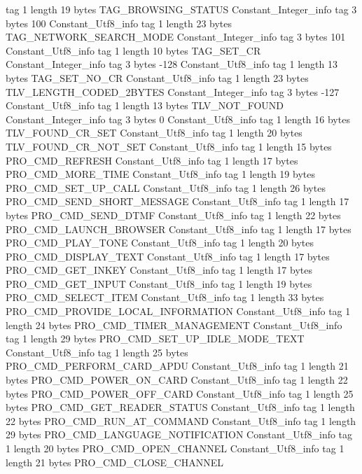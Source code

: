 {{{			tag	1
			length	19
			bytes	TAG_BROWSING_STATUS
		}
		Constant_Integer_info {
			tag	3
			bytes	100
		}
		Constant_Utf8_info {
			tag	1
			length	23
			bytes	TAG_NETWORK_SEARCH_MODE
		}
		Constant_Integer_info {
			tag	3
			bytes	101
		}
		Constant_Utf8_info {
			tag	1
			length	10
			bytes	TAG_SET_CR
		}
		Constant_Integer_info {
			tag	3
			bytes	-128
		}
		Constant_Utf8_info {
			tag	1
			length	13
			bytes	TAG_SET_NO_CR
		}
		Constant_Utf8_info {
			tag	1
			length	23
			bytes	TLV_LENGTH_CODED_2BYTES
		}
		Constant_Integer_info {
			tag	3
			bytes	-127
		}
		Constant_Utf8_info {
			tag	1
			length	13
			bytes	TLV_NOT_FOUND
		}
		Constant_Integer_info {
			tag	3
			bytes	0
		}
		Constant_Utf8_info {
			tag	1
			length	16
			bytes	TLV_FOUND_CR_SET
		}
		Constant_Utf8_info {
			tag	1
			length	20
			bytes	TLV_FOUND_CR_NOT_SET
		}
		Constant_Utf8_info {
			tag	1
			length	15
			bytes	PRO_CMD_REFRESH
		}
		Constant_Utf8_info {
			tag	1
			length	17
			bytes	PRO_CMD_MORE_TIME
		}
		Constant_Utf8_info {
			tag	1
			length	19
			bytes	PRO_CMD_SET_UP_CALL
		}
		Constant_Utf8_info {
			tag	1
			length	26
			bytes	PRO_CMD_SEND_SHORT_MESSAGE
		}
		Constant_Utf8_info {
			tag	1
			length	17
			bytes	PRO_CMD_SEND_DTMF
		}
		Constant_Utf8_info {
			tag	1
			length	22
			bytes	PRO_CMD_LAUNCH_BROWSER
		}
		Constant_Utf8_info {
			tag	1
			length	17
			bytes	PRO_CMD_PLAY_TONE
		}
		Constant_Utf8_info {
			tag	1
			length	20
			bytes	PRO_CMD_DISPLAY_TEXT
		}
		Constant_Utf8_info {
			tag	1
			length	17
			bytes	PRO_CMD_GET_INKEY
		}
		Constant_Utf8_info {
			tag	1
			length	17
			bytes	PRO_CMD_GET_INPUT
		}
		Constant_Utf8_info {
			tag	1
			length	19
			bytes	PRO_CMD_SELECT_ITEM
		}
		Constant_Utf8_info {
			tag	1
			length	33
			bytes	PRO_CMD_PROVIDE_LOCAL_INFORMATION
		}
		Constant_Utf8_info {
			tag	1
			length	24
			bytes	PRO_CMD_TIMER_MANAGEMENT
		}
		Constant_Utf8_info {
			tag	1
			length	29
			bytes	PRO_CMD_SET_UP_IDLE_MODE_TEXT
		}
		Constant_Utf8_info {
			tag	1
			length	25
			bytes	PRO_CMD_PERFORM_CARD_APDU
		}
		Constant_Utf8_info {
			tag	1
			length	21
			bytes	PRO_CMD_POWER_ON_CARD
		}
		Constant_Utf8_info {
			tag	1
			length	22
			bytes	PRO_CMD_POWER_OFF_CARD
		}
		Constant_Utf8_info {
			tag	1
			length	25
			bytes	PRO_CMD_GET_READER_STATUS
		}
		Constant_Utf8_info {
			tag	1
			length	22
			bytes	PRO_CMD_RUN_AT_COMMAND
		}
		Constant_Utf8_info {
			tag	1
			length	29
			bytes	PRO_CMD_LANGUAGE_NOTIFICATION
		}
		Constant_Utf8_info {
			tag	1
			length	20
			bytes	PRO_CMD_OPEN_CHANNEL
		}
		Constant_Utf8_info {
			tag	1
			length	21
			bytes	PRO_CMD_CLOSE_CHANNEL
}}}
